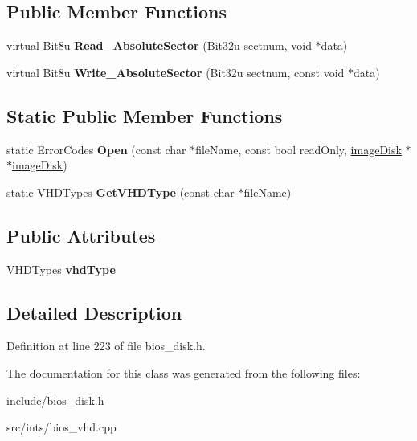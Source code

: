 \subsection*{Public Member Functions}
\begin{DoxyCompactItemize}
\item 
\hypertarget{classimageDiskVHD_a928117145e7f5abd8ff0f151d3d27186}{virtual Bit8u {\bfseries Read\-\_\-\-Absolute\-Sector} (Bit32u sectnum, void $\ast$data)}\label{classimageDiskVHD_a928117145e7f5abd8ff0f151d3d27186}

\item 
\hypertarget{classimageDiskVHD_a86534727d81baae796b45b6a795b73df}{virtual Bit8u {\bfseries Write\-\_\-\-Absolute\-Sector} (Bit32u sectnum, const void $\ast$data)}\label{classimageDiskVHD_a86534727d81baae796b45b6a795b73df}

\end{DoxyCompactItemize}
\subsection*{Static Public Member Functions}
\begin{DoxyCompactItemize}
\item 
\hypertarget{classimageDiskVHD_a8c85843d48694462046b6b9a02c8f4f9}{static Error\-Codes {\bfseries Open} (const char $\ast$file\-Name, const bool read\-Only, \hyperlink{classimageDisk}{image\-Disk} $\ast$$\ast$\hyperlink{classimageDisk}{image\-Disk})}\label{classimageDiskVHD_a8c85843d48694462046b6b9a02c8f4f9}

\item 
\hypertarget{classimageDiskVHD_ac493a1534615d6aa2c3a0cda6dbc9a31}{static V\-H\-D\-Types {\bfseries Get\-V\-H\-D\-Type} (const char $\ast$file\-Name)}\label{classimageDiskVHD_ac493a1534615d6aa2c3a0cda6dbc9a31}

\end{DoxyCompactItemize}
\subsection*{Public Attributes}
\begin{DoxyCompactItemize}
\item 
\hypertarget{classimageDiskVHD_a39c97d47ff1d52756d8cf86fc53e352d}{V\-H\-D\-Types {\bfseries vhd\-Type}}\label{classimageDiskVHD_a39c97d47ff1d52756d8cf86fc53e352d}

\end{DoxyCompactItemize}


\subsection{Detailed Description}


Definition at line 223 of file bios\-\_\-disk.\-h.



The documentation for this class was generated from the following files\-:\begin{DoxyCompactItemize}
\item 
include/bios\-\_\-disk.\-h\item 
src/ints/bios\-\_\-vhd.\-cpp\end{DoxyCompactItemize}
